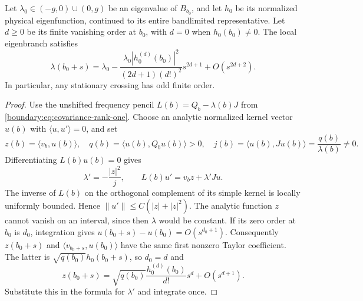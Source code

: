 \begin{proposition}
\label{interaction:prop:contact-order}
Let $\lambda_0\in(-g,0)\cup(0,g)$ be an eigenvalue of $B_{b_0}$,
and let $h_0$ be its normalized physical eigenfunction, continued to
its entire bandlimited representative. Let $d\ge0$ be its finite
vanishing order at $b_0$, with $d=0$ when $h_0(b_0)\ne0$.
The local eigenbranch satisfies
\[
 \lambda(b_0+s)=\lambda_0-
 \frac{\lambda_0|h_0^{(d)}(b_0)|^2}{(2d+1)(d!)^2}s^{2d+1}
 +O(s^{2d+2}).
\]
In particular, any stationary crossing has odd finite order.
\end{proposition}
\begin{proof}
Use the unshifted frequency pencil
$L(b)=Q_b-\lambda(b)J$ from
\eqref{boundary:eq:covariance-rank-one}. Choose an analytic normalized
kernel vector $u(b)$ with $\langle u,u'\rangle=0$, and set
\[
 z(b)=\langle v_b,u(b)\rangle,\quad
 q(b)=\langle u(b),Q_bu(b)\rangle>0,\quad
 j(b)=\langle u(b),Ju(b)\rangle=\frac{q(b)}{\lambda(b)}\ne0.
\]
Differentiating $L(b)u(b)=0$ gives
\[
 \lambda'=-\frac{|z|^2}{j},\qquad
 L(b)u'=v_bz+\lambda'Ju.
\]
The inverse of $L(b)$ on the orthogonal complement of its simple
kernel is locally uniformly bounded. Hence
$\|u'\|\le C(|z|+|z|^2)$.
The analytic function $z$ cannot vanish on an interval, since then
$\lambda$ would be constant. If its zero order at $b_0$ is $d_0$,
integration gives $u(b_0+s)-u(b_0)=O(s^{d_0+1})$.
Consequently $z(b_0+s)$ and
$\langle v_{b_0+s},u(b_0)\rangle$ have the same first nonzero Taylor
coefficient. The latter is $\sqrt{q(b_0)}h_0(b_0+s)$, so $d_0=d$ and
\[
 z(b_0+s)=\sqrt{q(b_0)}\frac{h_0^{(d)}(b_0)}{d!}s^d
             +O(s^{d+1}).
\]
Substitute this in the formula for $\lambda'$ and integrate once.
\end{proof}

